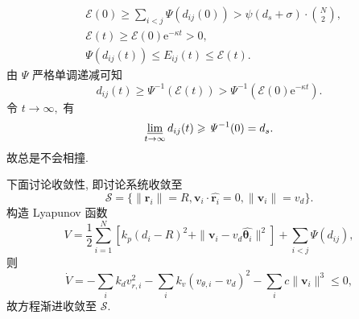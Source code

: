 \documentclass[12pt, a4paper, oneside]{ctexart}
\begin{document}
\begin{align*}
	&\mathcal{E}(0)\geqslant\sum_{i<j}\mathit{\Psi}(d_{ij}(0))>\psi(d_s+\sigma)\cdot\binom{N}{2},\\
	&\mathcal{E}(t)\geqslant\mathcal{E}(0)\mathrm{e}^{-\kappa t}>0,\\
	&\mathit{\Psi}(d_{ij}(t))\leqslant E_{ij}(t)\leqslant\mathcal{E}(t).
\end{align*}
由 $\mathit{\Psi}$ 严格单调递减可知
\begin{equation*}
	d_{ij}(t)\geqslant\mathit{\Psi}^{-1}(\mathcal{E}(t))>\mathit{\Psi}^{-1}(\mathcal{E}(0)\mathrm{e}^{-\kappa t}).
\end{equation*}
令 $t\to\infty,$ 有
\begin{equation*}
	\varliminf_{t\to\infty}d_{ij}(t)\geqslant\mathit{\Psi}^{-1}(0)=d_s.
\end{equation*}
故总是不会相撞.\par
下面讨论收敛性, 即讨论系统收敛至
\begin{equation*}
	\mathcal{S}=\{\|\boldsymbol{r}_i\|=R,\boldsymbol{v}_i\cdot\widehat{\boldsymbol{r}_i}=0,\|\boldsymbol{v}_i\|=v_d\}.
\end{equation*}
构造 Lyapunov 函数
\begin{equation*}
	V=\frac{1}{2}\sum_{i=1}^N[k_p(d_i-R)^2+\|\boldsymbol{v}_i-v_d\widehat{\boldsymbol{\theta}_i}\|^2]+\sum_{i<j}\mathit{\Psi}(d_{ij}),
\end{equation*}
则
\begin{equation*}
	\dot{V}=-\sum_{i}k_dv_{r,i}^2-\sum_ik_v(v_{\theta,i}-v_d)^2-\sum_ic\|\boldsymbol{v}_i\|^3\leqslant0,
\end{equation*}
故方程渐进收敛至 $\mathcal{S}$.
\end{document}
